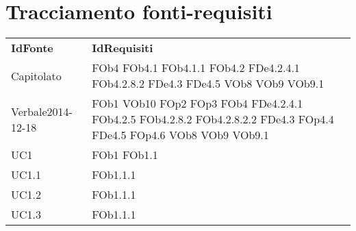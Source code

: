 \section{Tracciamento fonti-requisiti}
\begin{longtable}{|l|p{4cm}|}
\hline
\textbf{IdFonte} & \textbf{IdRequisiti} \\ 
Capitolato & FOb4 \linebreak  FOb4.1 \linebreak  FOb4.1.1 \linebreak  FOb4.2 \linebreak  FDe4.2.4.1 \linebreak  FOb4.2.8.2 \linebreak  FDe4.3 \linebreak  FDe4.5 \linebreak  VOb8 \linebreak  VOb9 \linebreak  VOb9.1 \linebreak   \\ 
\hline
		Verbale2014-12-18 & FOb1 \linebreak  VOb10 \linebreak  FOp2 \linebreak  FOp3 \linebreak  FOb4 \linebreak  FDe4.2.4.1 \linebreak  FOb4.2.5 \linebreak  FOb4.2.8.2 \linebreak  FOb4.2.8.2.2 \linebreak  FDe4.3 \linebreak  FOp4.4 \linebreak  FDe4.5 \linebreak  FOp4.6 \linebreak  VOb8 \linebreak  VOb9 \linebreak  VOb9.1 \linebreak   \\
\hline
		UC1 & FOb1 \linebreak  FOb1.1 \linebreak   \\
\hline
		UC1.1 & FOb1.1.1 \linebreak   \\
\hline
		UC1.2 & FOb1.1.1 \linebreak   \\
\hline
		UC1.3 & FOb1.1.1 \linebreak   \\

\end{longtable}
